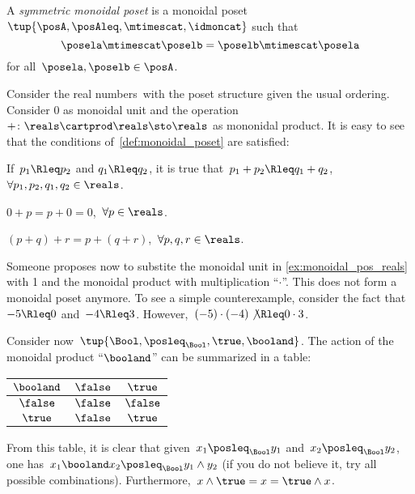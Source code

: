 \begin{ctdefinition}
    \label{def:sym_monoidal_poset}
    A \emph{symmetric monoidal poset} is a monoidal poset~$\tup{\posA, \posAleq, \mtimescat, \idmoncat}$ such that
    \begin{equation*}
        \posela \mtimescat \poselb = \poselb \mtimescat \posela
    \end{equation*}
    for all~$\posela, \poselb \in \posA$.
\end{ctdefinition}

\begin{example}
    \label{ex:monoidal_pos_reals}
    Consider the real numbers~\reals with the poset structure given the usual ordering.
    Consider 0 as monoidal unit and the operation~$+\colon \reals\cartprod \reals\sto \reals$ as mononidal product.
    It is easy to see that the conditions of~\cref{def:monoidal_poset} are satisfied:
    \begin{compactenum}[(a)]
        \item If~$p_1\Rleq  p_2$ and $q_1\Rleq  q_2$, it is true that~$p_1+p_2\Rleq  q_1+q_2$,~$\forall p_1,p_2,q_1,q_2\in \reals$.
        \item $0+p=p+0=0$,~$\forall p\in \reals$.
        \item $(p+q)+r=p+(q+r)$,~$\forall p,q,r\in \reals$.
    \end{compactenum}
\end{example}

\begin{example}
    Someone proposes now to substite the monoidal unit in \cref{ex:monoidal_pos_reals} with 1 and the monoidal product with
    multiplication ``$\cdot$''. This does not form a monoidal poset anymore. To see a simple counterexample, consider the fact that~$-5\Rleq 0$ and~$-4\Rleq 3$. However,~$(-5)\cdot (-4) \not{\Rleq} 0 \cdot 3$.
\end{example}

\begin{example}
    Consider now~$\tup{\Bool,\posleq_{\Bool},\true,\booland}$. The action of the monoidal product ``$\booland$'' can be summarized in a table:
    \begin{center}
        \begin{tabular}{c|cc}
            $\booland$ & $\false$ & $\true$  \\
            \hline
            $\false$   & $\false$ & $\false$ \\
            $\true$    & $\false$ & $\true$
        \end{tabular}
    \end{center}
    From this table, it is clear that given~$x_1\posleq_{\Bool}y_1$ and~$x_2\posleq_{\Bool} y_2$, one has~$x_1\booland x_2\posleq_{\Bool} y_1\wedge y_2$ (if you do not believe it, try all possible combinations). Furthermore,~$x\wedge \true=x=\true \wedge x$.
\end{example}

